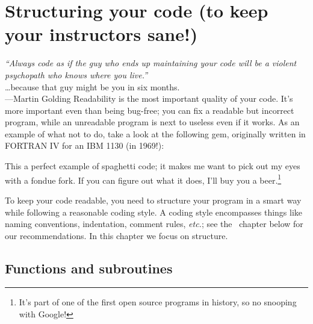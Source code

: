 \documentclass[openany,oneside]{report}
\renewenvironment{quote}{\list{}{\leftmargin=8\parindent}\item\relax}{\endlist}
\begin{document}
\chapter[Structuring your code]{Structuring your code (to keep your instructors sane!)}
\label{chap:Structure}

\begin{quote}\small
  \emph{``Always code as if the guy who ends up maintaining your code will be a violent psychopath who knows where you live.''} \\ \ldots because that guy might be you in six months. \\ \hspace*{\fill}---Martin Golding
\end{quote}
Readability is the most important quality of your code.
It's more important even than being bug-free; you can fix a readable but incorrect program, while an unreadable program is next to useless even if it works.
As an example of what not to do, take a look at the following gem, originally written in FORTRAN IV for an IBM 1130 (in 1969!):

This a perfect example of spaghetti code; it makes me want to pick out my eyes with a fondue fork.
If you can figure out what it does, I'll buy you a beer.\footnote{It's part of one of the first open source programs in history, so no snooping with Google!}

To keep your code readable, you need to structure your program in a smart way while following a reasonable coding style.
A coding style encompasses things like naming conventions, indentation, comment rules, \emph{etc.}; see the ~chapter below for our recommendations.
In this chapter we focus on structure.

\section{Functions and subroutines}
\end{document}

